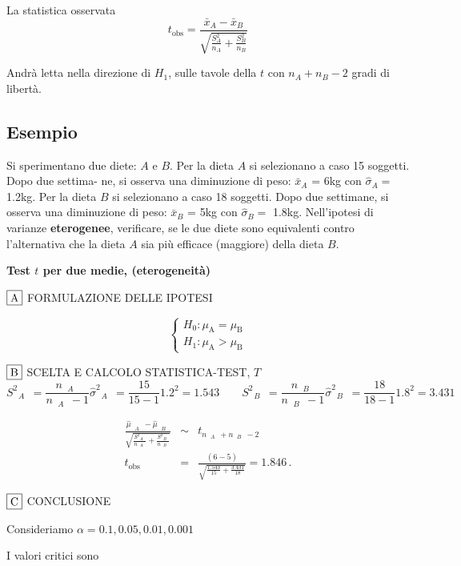 \documentclass[
  11pt,
]{book}
\theoremstyle{mytheoremstyle}
\theoremstyle{mydefstyle}
\begin{document}
La statistica osservata
\[t_{\text{obs}}=\frac{\bar x_A-\bar x_B}{\sqrt{\frac{S_A^2}{n_A}+\frac{S_B^2}{n_B}}}\]

Andrà letta nella direzione di \(H_1\), sulle tavole della \(t\) con \(n_A+n_B-2\) gradi di libertà.

\subsection{Esempio}\label{esempio-3}

Si sperimentano due diete: \(A\) e \(B\). Per la dieta \(A\) si
selezionano a caso 15 soggetti. Dopo due settima-
ne, si osserva una diminuzione di peso: \(\bar x_A\) = 6kg con
\(\hat\sigma_A=\) 1.2kg. Per la dieta \(B\) si selezionano a caso 18
soggetti. Dopo due settimane, si osserva una diminuzione di peso:
\(\bar x_B\) = 5kg con \(\hat\sigma_B=\) 1.8kg. Nell'ipotesi
di varianze \textbf{eterogenee}, verificare, se le due diete
sono equivalenti contro l'alternativa che la dieta \(A\) sia più efficace
(maggiore) della dieta \(B\).

\textbf{Test \(t\) per due medie, (eterogeneità)}

\(\fbox{A}\) FORMULAZIONE DELLE IPOTESI

\[\begin{cases}
   H_0: \mu_\text{A} = \mu_\text{B} \\
   H_1: \mu_\text{A} > \mu_\text{B} 
   \end{cases}\]

\(\fbox{B}\) SCELTA E CALCOLO STATISTICA-TEST, \(T\)
\[
     S^2_\text{ $A$ }=\frac{n_\text{ $A$ }}{n_\text{ $A$ }-1}\hat\sigma^2_\text{ $A$ }=\frac{ 15 }{ 15 -1} 1.2 ^2= 1.543  \qquad
     S^2_\text{ $B$ }=\frac{n_\text{ $B$ }}{n_\text{ $B$ }-1}\hat\sigma^2_\text{ $B$ }=\frac{ 18 }{ 18 -1} 1.8 ^2= 3.431 
   \]

\begin{eqnarray*}
   \frac{\hat\mu_\text{ $A$ } - \hat\mu_\text{ $B$ }}
   {\sqrt{\frac {S^2_\text{ $A$ }}{n_\text{ $A$ }}+\frac {S^2_\text{ $B$ }}{n_\text{ $B$ }}}}&\sim&t_{n_\text{ $A$ }+n_\text{ $B$ }-2}\\
   t_{\text{obs}}
   &=& \frac{ ( 6 -  5 )} {\sqrt{\frac{ 1.543 }{ 15 }+\frac{ 3.431 }{ 18 }}}
   =   1.846 \, .
   \end{eqnarray*}

\(\fbox{C}\) CONCLUSIONE

Consideriamo \(\alpha=0.1, 0.05, 0.01, 0.001\)

I valori critici sono
\end{document}

